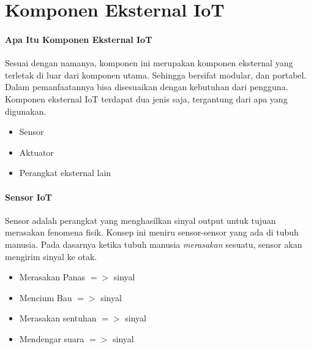 

\section{Komponen Eksternal IoT}
\begin{frame}{\insertsectionhead}
	\framesubtitle{Apa Itu Komponen Eksternal IoT}
	\justifying
	Sesuai dengan namanya, komponen ini merupakan komponen eksternal yang terletak di luar dari komponen utama. Sehingga bersifat modular, dan portabel. Dalam pemanfaatannya bisa disesuaikan dengan kebutuhan dari pengguna.
	\vfill
	Komponen eksternal IoT terdapat dua jenis saja, tergantung dari apa yang digunakan.
	\begin{itemize}
		\item Sensor
		\item Aktuator
		\item Perangkat eksternal lain
	\end{itemize}
\end{frame}

\begin{frame}{\insertsectionhead}
	\framesubtitle{Sensor IoT}
	\justifying
	Sensor adalah perangkat yang menghasilkan sinyal output untuk tujuan merasakan fenomena fisik. Konsep ini meniru sensor-sensor yang ada di tubuh manusia. Pada dasarnya ketika tubuh manusia \textit{merasakan} sesuatu, sensor akan mengirim sinyal ke otak.
	\begin{itemize}
		\item Merasakan Panas $=>$ sinyal
		\item Mencium Bau $=>$ sinyal
		\item Merasakan sentuhan $=>$ sinyal
		\item Mendengar suara $=>$ sinyal
	\end{itemize}
\end{frame}

